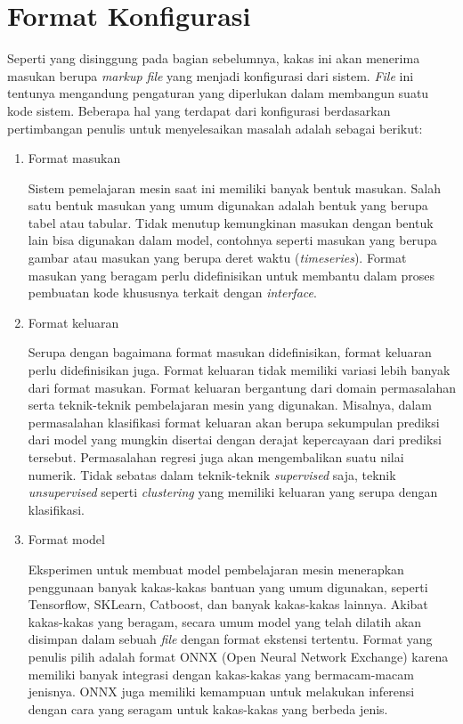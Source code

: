 \section{Format Konfigurasi}

Seperti yang disinggung pada bagian sebelumnya, kakas ini akan menerima masukan berupa \textit{markup file} yang menjadi konfigurasi dari sistem.
\textit{File} ini tentunya mengandung pengaturan yang diperlukan dalam membangun suatu kode sistem.
Beberapa hal yang terdapat dari konfigurasi berdasarkan pertimbangan penulis untuk menyelesaikan masalah adalah sebagai berikut:

\begin{enumerate}
	\item Format masukan
	
	Sistem pemelajaran mesin saat ini memiliki banyak bentuk masukan.
	Salah satu bentuk masukan yang umum digunakan adalah bentuk yang berupa tabel atau tabular.
	Tidak menutup kemungkinan masukan dengan bentuk lain bisa digunakan dalam model, contohnya seperti masukan yang berupa gambar atau masukan yang berupa deret waktu (\textit{timeseries}).
	Format masukan yang beragam perlu didefinisikan untuk membantu dalam proses pembuatan kode khususnya terkait dengan \textit{interface}.

	\item Format keluaran
	
	Serupa dengan bagaimana format masukan didefinisikan, format keluaran perlu didefinisikan juga.
	Format keluaran tidak memiliki variasi lebih banyak dari format masukan.
	Format keluaran bergantung dari domain permasalahan serta teknik-teknik pembelajaran mesin yang digunakan.
	Misalnya, dalam permasalahan klasifikasi format keluaran akan berupa sekumpulan prediksi dari model yang mungkin disertai dengan derajat kepercayaan dari prediksi tersebut.
	Permasalahan regresi juga akan mengembalikan suatu nilai numerik.
	Tidak sebatas dalam teknik-teknik \textit{supervised} saja, teknik \textit{unsupervised} seperti \textit{clustering} yang memiliki keluaran yang serupa dengan klasifikasi.

	\item Format model
	
	Eksperimen untuk membuat model pembelajaran mesin menerapkan penggunaan banyak kakas-kakas bantuan yang umum digunakan, seperti Tensorflow, SKLearn, Catboost, dan banyak kakas-kakas lainnya.
	Akibat kakas-kakas yang beragam, secara umum model yang telah dilatih akan disimpan dalam sebuah \textit{file} dengan format ekstensi tertentu.
	Format yang penulis pilih adalah format ONNX (Open Neural Network Exchange) karena memiliki banyak integrasi dengan kakas-kakas yang bermacam-macam jenisnya.
	ONNX juga memiliki kemampuan untuk melakukan inferensi dengan cara yang seragam untuk kakas-kakas yang berbeda jenis. 


\end{enumerate}
